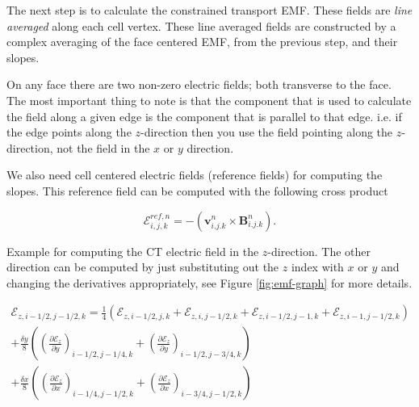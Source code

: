 The next step is to calculate the constrained transport EMF. These fields are \emph{line averaged} along each cell vertex. These line averaged fields are constructed by a complex averaging of the face centered EMF, from the previous step, and their slopes.


On any face there are two non-zero electric fields; both transverse to the face. The most important thing to note is that the component that is used to calculate the field along a given edge is the component that is parallel to that edge. i.e. if the edge points along the $ z $-direction then you use the field pointing along the $ z $-direction, not the field in the $ x $ or $ y $ direction.

We also need cell centered electric fields (reference fields) for computing the slopes. This reference field can be computed with the following cross product

\begin{equation}
    \mathcal{E}_{i,j,k}^{ref,n} = - \left( \boldsymbol{v}^{n}_{i.j.k} \times \boldsymbol{B}^{n}_{i.j.k} \right).
\end{equation}

Example for computing the CT electric field in the $ z $-direction. The other direction can be computed by just substituting out the $ z $ index with $ x $ or $ y $ and changing the derivatives appropriately, see Figure \ref{fig:emf-graph} for more details.

\begin{equation}
    \label{eqn:emf-edge}
    \begin{aligned}
        \mathcal{E}_{z, i-1/2, j-1/2, k} = \frac{1}{4} \left(
              \mathcal{E}_{z, i-1/2, j, k}
            + \mathcal{E}_{z, i, j-1/2, k}
            + \mathcal{E}_{z, i-1/2, j-1, k}
            + \mathcal{E}_{z, i-1, j-1/2, k}\right) \\
        + \frac{\delta y}{8} \left( \left( \frac{\partial \mathcal{E}_z }{\partial y} \right)_{i-1/2, j-1/4, k} + \left(  \frac{\partial \mathcal{E}_z }{\partial y} \right)_{i-1/2, j-3/4, k} \right) \\
        + \frac{\delta x}{8} \left( \left( \frac{\partial \mathcal{E}_z }{\partial x} \right)_{i-1/4, j-1/2, k} + \left(  \frac{\partial \mathcal{E}_z }{\partial x} \right)_{i-3/4, j-1/2, k} \right)
    \end{aligned}
\end{equation}

